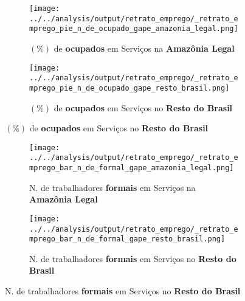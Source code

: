 \documentclass[11pt]{beamer}
\begin{document}
\begin{frame}[label=_retrato_emprego_pie_n_de_ocupado_gape]{}
\textit{\hyperlink{indice_principal}{}}
\begin{figure}
\centering
\begin{subfigure}{.5\textwidth}
  \centering
  \texttt{[image: ../../analysis/output/retrato\_emprego/\_retrato\_emprego\_pie\_n\_de\_ocupado\_gape\_amazonia\_legal.png]}
  \label{fig:_retrato_emprego_pie_n_de_ocupado_gape_amazonia_legal}
  \caption{{\tiny $(\%)$ de \textbf{ocupados} em Serviços na \textbf{Amazônia Legal}}}
\end{subfigure}%
\begin{subfigure}{.5\textwidth}
  \centering
  \texttt{[image: ../../analysis/output/retrato\_emprego/\_retrato\_emprego\_pie\_n\_de\_ocupado\_gape\_resto\_brasil.png]}
  \label{fig:_retrato_emprego_pie_n_de_ocupado_gape_resto_brasil}
   \caption{{\tiny $(\%)$ de \textbf{ocupados} em Serviços no \textbf{Resto do Brasil}}}
\end{subfigure}
\end{figure}
\end{frame}


\begin{frame}[label=_retrato_emprego_bar_n_de_formal_gape]{}
\textit{\hyperlink{indice_principal}{}}
\begin{figure}
\centering
\begin{subfigure}{.5\textwidth}
  \centering
  \texttt{[image: ../../analysis/output/retrato\_emprego/\_retrato\_emprego\_bar\_n\_de\_formal\_gape\_amazonia\_legal.png]}
  \label{fig:_retrato_emprego_bar_n_de_formal_gape_amazonia_legal}
  \caption{{\tiny N. de trabalhadores \textbf{formais} em Serviços na \textbf{Amazônia Legal}}}
\end{subfigure}%
\begin{subfigure}{.5\textwidth}
  \centering
  \texttt{[image: ../../analysis/output/retrato\_emprego/\_retrato\_emprego\_bar\_n\_de\_formal\_gape\_resto\_brasil.png]}
  \label{fig:_retrato_emprego_bar_n_de_formal_gape_resto_brasil}
   \caption{{\tiny N. de trabalhadores \textbf{formais} em Serviços no \textbf{Resto do Brasil}}}
\end{subfigure}
\end{figure}
\end{frame}
\end{document}
